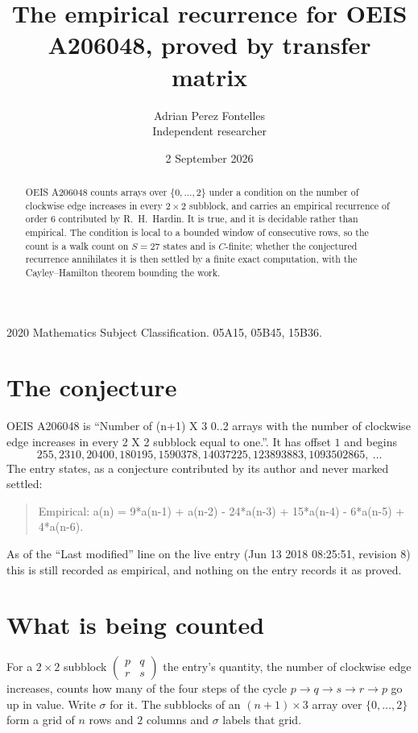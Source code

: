 \documentclass[11pt,a4paper]{article}
\title{The empirical recurrence for OEIS A206048, proved by transfer matrix}
\author{Adrian Perez Fontelles\\ \small Independent researcher}
\date{2 September 2026}
\theoremstyle{plain}
\theoremstyle{definition}
\begin{document}
\maketitle

\begin{abstract}
OEIS A206048 counts arrays over $\{0,\dots,2\}$ under a condition on the number of clockwise edge increases
in every $2\times2$ subblock, and carries an empirical recurrence of order $6$ contributed by
R.~H.~Hardin. It is true, and it is decidable rather than empirical. The condition is local to
a bounded window of consecutive rows, so the count is a walk count on $S=27$ states and is
$C$-finite; whether the conjectured recurrence annihilates it is then settled by a finite exact
computation, with the Cayley--Hamilton theorem bounding the work.
\end{abstract}

\noindent\small 2020 Mathematics Subject Classification. 05A15, 05B45, 15B36.\normalsize

\section{The conjecture}

OEIS A206048 is ``Number of (n+1) X 3 0..2 arrays with the number of clockwise edge increases in every 2 X 2 subblock equal to one.''. It has offset $1$ and begins
\[
255, 2310, 20400, 180195, 1590378, 14037225, 123893883, 1093502865,\ \dots
\]
The entry states, as a conjecture contributed by its author and never marked settled:
\begin{quote}
Empirical: a(n) = 9*a(n-1) + a(n-2) - 24*a(n-3) + 15*a(n-4) - 6*a(n-5) + 4*a(n-6).
\end{quote}
As of the ``Last modified'' line on the live entry (Jun 13 2018 08:25:51, revision 8) this is still
recorded as empirical, and nothing on the entry records it as proved.

\section{What is being counted}

For a $2\times2$ subblock $\begin{pmatrix}p&q\\r&s\end{pmatrix}$ the
entry's quantity, the number of clockwise edge increases, counts how many of the four steps of the cycle $p\to q\to s\to r\to p$ go up in value. Write $\sigma$ for it. The subblocks of an
$(n+1)\times3$ array over $\{0,\dots,2\}$ form a grid of $n$ rows and $2$
columns and $\sigma$ labels that grid.
\end{document}
